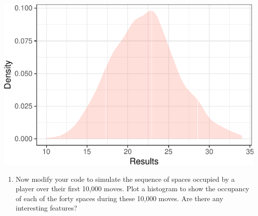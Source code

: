 \documentclass[]{article}
\providecommand{\tightlist}{%
  \setlength{\itemsep}{0pt}\setlength{\parskip}{0pt}}
\begin{document}
\begin{center}\includegraphics{exercises_files/figure-latex/unnamed-chunk-6-1} \end{center}

\begin{enumerate}
\def\labelenumi{\arabic{enumi}.}
\setcounter{enumi}{1}
\tightlist
\item
  Now modify your code to simulate the sequence of spaces occupied by a
  player over their first 10,000 moves. Plot a histogram to show the
  occupancy of each of the forty spaces during these 10,000 moves. Are
  there any interesting features?
\end{enumerate}
\end{document}
